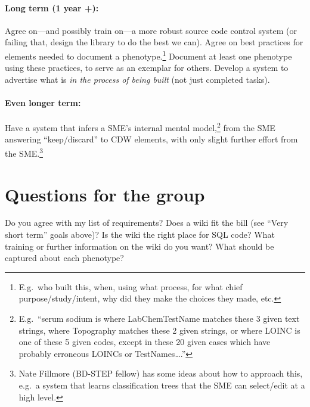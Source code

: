 \documentclass{tufte-handout}
\begin{document}
\paragraph{Long term (1 year +):}
Agree on---and possibly train on---a more robust source code control
system (or failing that, design the library to do the best we can).
Agree on best practices for elements needed to document a
phenotype.\footnote{E.g.\ who built this, when, using what process,
  for what chief purpose/study/intent, why did they make the choices
  they made, etc.} Document at least one phenotype using these
practices, to serve as an exemplar for others. Develop a system to
advertise what is \emph{in the process of being built} (not just
completed tasks).

\paragraph{Even longer term:}
Have a system that infers a SME's internal mental
model,\footnote{E.g.\ ``serum sodium is where LabChemTestName matches
  these 3 given text strings, where Topography matches these 2 given
  strings, or where LOINC is one of these 5 given codes, except in
  these 20 given cases which have probably erroneous LOINCs or
  TestNames\ldots{}.''} from the SME answering ``keep/discard'' to CDW
elements, with only slight further effort from the SME.\footnote{Nate
  Fillmore (BD-STEP fellow) has some ideas about how to approach this,
  e.g.\ a system that learns classification trees that the SME can
  select/edit at a high level.}

\section{Questions for the group}

Do you agree with my list of requirements? Does a wiki fit the bill
(see ``Very short term'' goals above)? Is the wiki the right place for
SQL code? What training or further information on the wiki do you
want? What should be captured about each phenotype?
\end{document}
